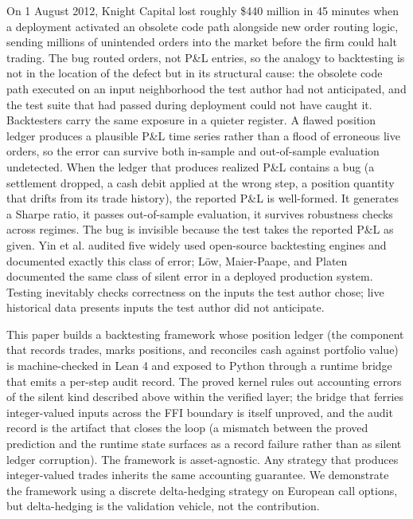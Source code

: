 \documentclass[
  11pt,
  letterpaper,
  DIV=12,
  numbers=noendperiod]{scrartcl}
\numberwithin{equation}{section}
\numberwithin{figure}{section}
\numberwithin{table}{section}
\begin{document}
On 1 August 2012, Knight Capital lost roughly \$440 million in 45
minutes when a deployment activated an obsolete code path alongside new
order routing logic, sending millions of unintended orders into the
market before the firm could halt trading. The bug routed orders, not
P\&L entries, so the analogy to backtesting is not in the location of
the defect but in its structural cause: the obsolete code path executed
on an input neighborhood the test author had not anticipated, and the
test suite that had passed during deployment could not have caught it.
Backtesters carry the same exposure in a quieter register. A flawed
position ledger produces a plausible P\&L time series rather than a
flood of erroneous live orders, so the error can survive both in-sample
and out-of-sample evaluation undetected. When the ledger that produces
realized P\&L contains a bug (a settlement dropped, a cash debit applied
at the wrong step, a position quantity that drifts from its trade
history), the reported P\&L is well-formed. It generates a Sharpe ratio,
it passes out-of-sample evaluation, it survives robustness checks across
regimes. The bug is invisible because the test takes the reported P\&L
as given. Yin et al.  audited five
widely used open-source backtesting engines and documented exactly this
class of error; Löw, Maier-Paape, and Platen
 documented the same class of silent
error in a deployed production system. Testing inevitably checks
correctness on the inputs the test author chose; live historical data
presents inputs the test author did not anticipate.

This paper builds a backtesting framework whose position ledger (the
component that records trades, marks positions, and reconciles cash
against portfolio value) is machine-checked in Lean 4 and exposed to
Python through a runtime bridge that emits a per-step audit record. The
proved kernel rules out accounting errors of the silent kind described
above within the verified layer; the bridge that ferries integer-valued
inputs across the FFI boundary is itself unproved, and the audit record
is the artifact that closes the loop (a mismatch between the proved
prediction and the runtime state surfaces as a record failure rather
than as silent ledger corruption). The framework is asset-agnostic. Any
strategy that produces integer-valued trades inherits the same
accounting guarantee. We demonstrate the framework using a discrete
delta-hedging strategy on European call options, but delta-hedging is
the validation vehicle, not the contribution.
\end{document}
